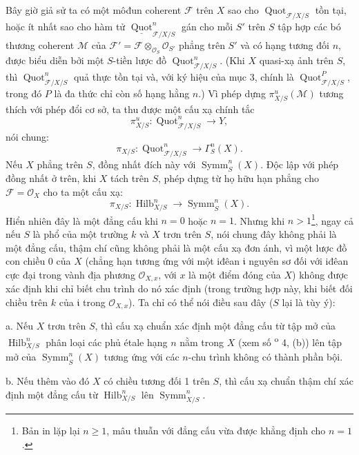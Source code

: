 Bây giờ giả sử ta có một môđun coherent $\mathcal F$ trên $X$ sao cho
$\operatorname{Quot}_{\mathcal F/X/S}$ tồn tại, hoặc ít nhất sao cho hàm tử
$\underline{\operatorname{Quot}}^n_{\mathcal F/X/S}$ gán cho mỗi $S'$ trên
$S$ tập hợp các bó thương coherent $\mathcal M$ của
$\mathcal F'=\mathcal F\otimes_{\mathcal O_S}\mathcal O_{S'}$ phẳng trên
$S'$ và có hạng tương đối $n$, được biểu diễn bởi một $S$-tiền lược đồ
$\operatorname{Quot}^n_{\mathcal F/X/S}$. (Khi $X$ quasi-xạ ảnh trên $S$,
thì $\operatorname{Quot}^n_{\mathcal F/X/S}$ quả thực tồn tại và, với ký hiệu
của mục 3, chính là $\operatorname{Quot}^P_{\mathcal F/X/S}$, trong đó $P$ là
đa thức chỉ còn số hạng hằng $n$.) Vì phép dựng
$\pi^u_{X/S}(\mathcal M)$ tương thích với phép đổi cơ sở, ta thu được một cấu
xạ chính tắc
\[
\pi^u_{X/S}:\operatorname{Quot}^n_{\mathcal F/X/S}\longrightarrow Y,
\]
nói chung:
\[
\pi_{X/S}:\operatorname{Quot}^n_{\mathcal F/X/S}
\longrightarrow\Gamma^n_S(X).
\]
Nếu $X$ phẳng trên $S$, đồng nhất đích này với $\operatorname{Symm}^n_S(X)$.
Độc lập với phép đồng nhất ở trên, khi $X$ tách trên $S$, phép dựng từ họ hữu hạn phẳng cho $\mathcal F=\mathcal O_X$ cho ta một cấu xạ:
\[
\pi_{X/S}:\operatorname{Hilb}^n_{X/S}
\longrightarrow\operatorname{Symm}^n_S(X).
\]
Hiển nhiên đây là một đẳng cấu khi $n=0$ hoặc $n=1$. Nhưng khi
$n>1$\footnote{Bản in lặp lại $n\geq1$, mâu thuẫn với đẳng cấu vừa được khẳng
định cho $n=1$.}, ngay cả nếu $S$ là phổ của một trường $k$ và $X$ trơn trên
$S$, nói chung đây không phải là một đẳng cấu, thậm chí cũng không phải là một
cấu xạ đơn ánh, vì một lược đồ con chiều 0 của $X$ (chẳng hạn tương ứng với
một iđêan $\mathfrak i$ nguyên sơ đối với iđêan cực đại trong vành địa phương
$\mathcal O_{X,x}$, với $x$ là một điểm đóng của $X$) không được xác định khi
chỉ biết chu trình do nó xác định (trong trường hợp này, khi biết đối chiều
trên $k$ của $\mathfrak i$ trong $\mathcal O_{X,x}$). Ta chỉ có thể nói điều
sau đây ($S$ lại là tùy ý):

\medskip
\noindent a. Nếu $X$ trơn trên $S$, thì cấu xạ chuẩn xác định một đẳng cấu từ
tập mở của $\operatorname{Hilb}^n_{X/S}$ phân loại các phủ étale hạng $n$ nằm
trong $X$ (xem số \textsuperscript{o} 4, (b)) lên tập mở của
$\operatorname{Symm}^n_S(X)$ tương ứng với các $n$-chu trình không có thành
phần bội.

\medskip
\noindent b. Nếu thêm vào đó $X$ có chiều tương đối 1 trên $S$, thì cấu xạ
chuẩn thậm chí xác định một đẳng cấu từ $\operatorname{Hilb}^n_{X/S}$ lên
$\operatorname{Symm}^n_{X/S}$.

